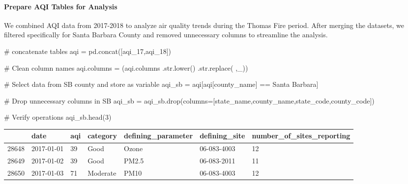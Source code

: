 \documentclass[
  letterpaper,
  DIV=11,
  numbers=noendperiod]{scrartcl}
\let\oldparagraph\paragraph
\renewcommand{\paragraph}[1]{\oldparagraph{#1}\mbox{}}
\newenvironment{Shaded}{\begin{snugshade}}{\end{snugshade}}
\newcommand{\BuiltInTok}[1]{\textcolor[rgb]{0.00,0.23,0.31}{#1}}
\newcommand{\CommentTok}[1]{\textcolor[rgb]{0.37,0.37,0.37}{#1}}
\newcommand{\DecValTok}[1]{\textcolor[rgb]{0.68,0.00,0.00}{#1}}
\newcommand{\NormalTok}[1]{\textcolor[rgb]{0.00,0.23,0.31}{#1}}
\newcommand{\OperatorTok}[1]{\textcolor[rgb]{0.37,0.37,0.37}{#1}}
\newcommand{\StringTok}[1]{\textcolor[rgb]{0.13,0.47,0.30}{#1}}
\begin{document}
\hypertarget{prepare-aqi-tables-for-analysis}{%
\paragraph{Prepare AQI Tables for
Analysis}\label{prepare-aqi-tables-for-analysis}}

We combined AQI data from 2017-2018 to analyze air quality trends during
the Thomas Fire period. After merging the datasets, we filtered
specifically for Santa Barbara County and removed unnecessary columns to
streamline the analysis.

\begin{Shaded}
\begin{Highlighting}[]
\CommentTok{\# concatenate tables}
\NormalTok{aqi }\OperatorTok{=}\NormalTok{ pd.concat([aqi\_17,aqi\_18])}

\CommentTok{\# Clean column names}
\NormalTok{aqi.columns }\OperatorTok{=}\NormalTok{ (aqi.columns}
\NormalTok{                  .}\BuiltInTok{str}\NormalTok{.lower()}
\NormalTok{                  .}\BuiltInTok{str}\NormalTok{.replace(}\StringTok{\textquotesingle{} \textquotesingle{}}\NormalTok{,}\StringTok{\textquotesingle{}\_\textquotesingle{}}\NormalTok{))}

\CommentTok{\# Select data from SB county and store as variable}
\NormalTok{aqi\_sb }\OperatorTok{=}\NormalTok{ aqi[aqi[}\StringTok{\textquotesingle{}county\_name\textquotesingle{}}\NormalTok{] }\OperatorTok{==} \StringTok{\textquotesingle{}Santa Barbara\textquotesingle{}}\NormalTok{] }

\CommentTok{\# Drop unnecessary columns in SB}
\NormalTok{aqi\_sb }\OperatorTok{=}\NormalTok{ aqi\_sb.drop(columns}\OperatorTok{=}\NormalTok{[}\StringTok{\textquotesingle{}state\_name\textquotesingle{}}\NormalTok{,}\StringTok{\textquotesingle{}county\_name\textquotesingle{}}\NormalTok{,}\StringTok{\textquotesingle{}state\_code\textquotesingle{}}\NormalTok{,}\StringTok{\textquotesingle{}county\_code\textquotesingle{}}\NormalTok{])}

\CommentTok{\# Verify operations }
\NormalTok{aqi\_sb.head(}\DecValTok{3}\NormalTok{)}
\end{Highlighting}
\end{Shaded}

\begin{longtable}[]{@{}lllllll@{}}
\toprule()
& date & aqi & category & defining\_parameter & defining\_site &
number\_of\_sites\_reporting \\
\midrule()
\endhead
28648 & 2017-01-01 & 39 & Good & Ozone & 06-083-4003 & 12 \\
28649 & 2017-01-02 & 39 & Good & PM2.5 & 06-083-2011 & 11 \\
28650 & 2017-01-03 & 71 & Moderate & PM10 & 06-083-4003 & 12 \\
\bottomrule()
\end{longtable}
\end{document}
